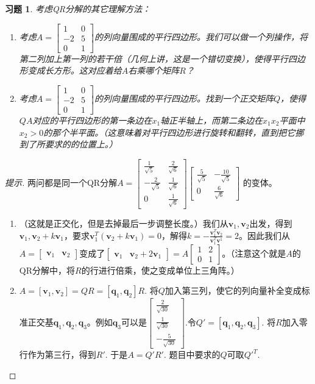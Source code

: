 \documentclass[UTF8]{ctexart}
\newtheorem{ex}[thm]{习题}
\begin{document}
\begin{ex}
考虑QR分解的其它理解方法：
\begin{enumerate}
\item 考虑$A=\begin{bmatrix}1&0\\-2&5\\0&1\end{bmatrix}$的列向量围成的平行四边形。我们可以做一个列操作，将第二列加上第一列的若干倍（几何上讲，这是一个错切变换），使得平行四边形变成长方形。这对应着给$A$右乘哪个矩阵$R$？
\item 考虑$A=\begin{bmatrix}1&0\\-2&5\\0&1\end{bmatrix}$的列向量围成的平行四边形。找到一个正交矩阵$Q$，使得$QA$对应的平行四边形的第一条边在$x_1$轴正半轴上，而第二条边在$x_1x_2$平面中$x_2>0$的那个半平面。（这意味着对平行四边形进行旋转和翻转，直到把它挪到了所要求的的位置上。）
\end{enumerate}
\end{ex}
\begin{proof}[提示]
两问都是同一个QR分解$A=\begin{bmatrix}\frac{1}{\sqrt{5}}&\frac{2}{\sqrt{6}}\\-\frac{2}{\sqrt{5}}&\frac{1}{\sqrt{6}}\\0&\frac{1}{\sqrt{6}}\end{bmatrix}\begin{bmatrix}\frac{5}{\sqrt{5}}&-\frac{10}{\sqrt{5}}\\0&\frac{6}{\sqrt{6}}\end{bmatrix}$ 的变体。
\begin{enumerate}
\item （这就是正交化，但是去掉最后一步调整长度。）我们从$\bm v_1,\bm v_2$出发，得到$\bm v_1,\bm v_2+k\bm v_1$，要求$\bm v_1^T(\bm v_2+k\bm v_1)=0$，解得$k=-\frac{\bm v_1^T\bm v_2}{\bm v_1^T\bm v^1}=2$。因此我们从$A=\begin{bmatrix}\bm v_1&\bm v_2\end{bmatrix}$变成了$\begin{bmatrix}\bm v_1&\bm v_2+2\bm v_1\end{bmatrix}=A\begin{bmatrix}1&2\\0&1\end{bmatrix}$。（注意这个就是$A$的QR分解中，将$R$的行进行倍乘，使之变成单位上三角阵。）
\item $A = [\bm v_1, \bm v_2] = QR = [\bm q_1,\bm q_2] R$. 将$Q$加入第三列，使它的列向量补全变成标准正交基$\bm q_1, \bm q_2,\bm q_3$。例如$\bm q_3$可以是$\begin{bmatrix}\frac{2}{\sqrt{30}}\\\frac{1}{\sqrt{30}}\\-\frac{5}{\sqrt{30}}\end{bmatrix}$.令$Q' = [\bm q_1,\bm q_2, \bm q_3].$ 将$R$加入零行作为第三行，得到$R'.$ 于是$A = Q ' R'.$ 题目中要求的$Q$可取${Q'}^T.$
\end{enumerate}
\end{proof}
\end{document}
